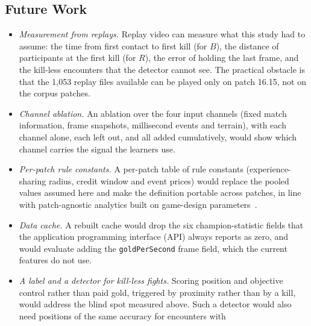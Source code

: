 \subsection{Future Work}\label{subsec:future-work}

\begin{itemize}
\item \emph{Measurement from replays.} Replay video can measure what this study had to assume: the
  time from first contact to first kill (for $B$), the distance of participants at the first kill
  (for $R$), the error of holding the last frame, and the kill-less encounters that the detector
  cannot see. The practical obstacle is that the 1,053 replay files available can be played only
  on patch 16.15, not on the corpus patches.
\item \emph{Channel ablation.} An ablation over the four input channels (fixed match information,
  frame snapshots, millisecond events and terrain), with each channel alone, each left out, and all
  added cumulatively, would show which channel carries the signal the learners use.
\item \emph{Per-patch rule constants.} A per-patch table of rule constants (experience-sharing
  radius, credit window and event prices) would replace the pooled values assumed here and make the
  definition portable across patches, in line with patch-agnostic analytics built on game-design
  parameters~\cite{chitayat2023beyond}.
\item \emph{Data cache.} A rebuilt cache would drop the six champion-statistic fields that the
  application programming interface (API) always reports as zero, and would evaluate adding the
  \texttt{goldPerSecond} frame field, which the current features do not use.
\item \emph{A label and a detector for kill-less fights.} Scoring position and objective control
  rather than paid gold, triggered by proximity rather than by a kill, would address the blind spot
  measured above. Such a detector would also need positions of the same accuracy for encounters with

\end{itemize}
